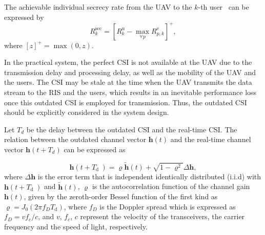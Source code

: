 \documentclass[12pt, draftclsnofoot, onecolumn]{IEEEtran}
\begin{document}
The achievable individual secrecy rate from the UAV to the $k$-th user~\cite{secure-1} can be expressed by
\begin{equation}\label{secure}
  R_{k}^{\mathrm{sec}}=\left[R_{k}^{\mathrm{u}}-\max _{\forall p} R_{p, k}^{\mathrm{e}}\right]^{+}, 
\end{equation}
where $[z]^{+}=\max (0, z)$.

In the practical system, the perfect CSI is not available at the UAV due to the transmission delay and processing delay, as well as the mobility of the UAV and the users. The CSI may be stale at the time when the UAV transmits the data stream to the RIS and the users, which results in an inevitable performance loss once this outdated CSI is employed for transmission. Thus, the outdated CSI should be explicitly considered in the system design.



Let $T_d$ be the delay between the outdated CSI and the real-time CSI. The relation between the outdated channel vector $\bm{h}(t)$ and the real-time channel vector $\bm{h}(t+T_d)$ can be expressed as~\cite{CSI-error-2}

\begin{equation}\label{CSI-error-1}
  \bm{h}\left(t+T_{\text {d }}\right)=\varrho \tilde{\bm{h}}(t)+\sqrt{1-\varrho^{2}}\Delta \bm{h},
\end{equation}
where $\Delta {\bm{h}}$ is the error term that is independent identically distributed (i.i.d) with $\bm{h}\left(t+T_{\text {d }}\right)$ and $\tilde{\bm{h}}(t)$, $\varrho $ is the autocorrelation function of the channel gain $\bm{h}(t)$, given by the zeroth-order Bessel function of the first kind as
  $ \varrho=J_{0}\left(2 \pi f_{D} T_{\mathrm{d}}\right) $,
where $f_D$ is the Doppler spread which is expressed as $f_{D}=v f_{c} / c$, and $v$, $f_c$, $c$ represent the velocity of the transceivers, the carrier frequency and the speed of light, respectively. 
\end{document}
